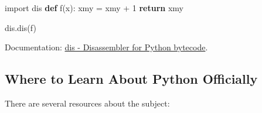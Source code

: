 \documentclass[
]{article}
\newenvironment{Shaded}{}{}
\newcommand{\ControlFlowTok}[1]{\textcolor[rgb]{0.00,0.44,0.13}{\textbf{#1}}}
\newcommand{\DecValTok}[1]{\textcolor[rgb]{0.25,0.63,0.44}{#1}}
\newcommand{\ImportTok}[1]{#1}
\newcommand{\KeywordTok}[1]{\textcolor[rgb]{0.00,0.44,0.13}{\textbf{#1}}}
\newcommand{\NormalTok}[1]{#1}
\newcommand{\OperatorTok}[1]{\textcolor[rgb]{0.40,0.40,0.40}{#1}}
\begin{document}
\begin{Shaded}
\begin{Highlighting}[]
\ImportTok{import}\NormalTok{ dis}
\KeywordTok{def}\NormalTok{ f(x):}
\NormalTok{    xmy }\OperatorTok{=}\NormalTok{ xmy }\OperatorTok{+} \DecValTok{1}
    \ControlFlowTok{return}\NormalTok{ xmy}

\NormalTok{dis.dis(f)}
\end{Highlighting}
\end{Shaded}

Documentation:
\href{https://docs.python.org/3/library/dis.html?highlight=dis\#module-dis}{dis
- Disassembler for Python bytecode}.

\hypertarget{where-to-learn-about-python-officially}{%
\subsection{Where to Learn About Python
Officially}\label{where-to-learn-about-python-officially}}

There are several resources about the subject:
\end{document}
